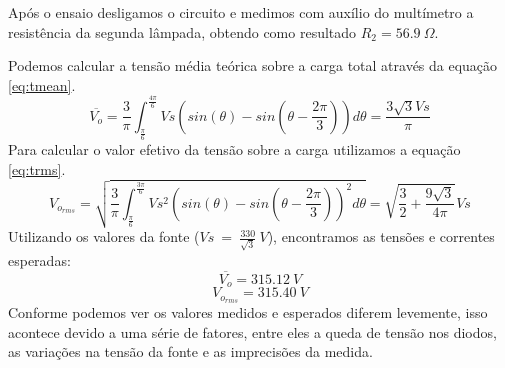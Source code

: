 \documentclass{report}
\begin{document}
Após o ensaio desligamos o circuito e medimos com auxílio do multímetro a resistência da segunda lâmpada, obtendo como resultado $R_2=56.9\ \Omega$.

Podemos calcular a tensão média teórica sobre a carga total através da equação \ref{eq:tmean}.
\begin{equation}
	\overline{V_o} = \frac{3}{\pi} \int_{\frac{\pi}{6}}^{\frac{4\pi}{6}}{Vs(sin(\theta) - sin(\theta - \frac{2\pi}{3}))d\theta} = \frac{3\sqrt{3}Vs}{\pi}
	\label{eq:tmean}
\end{equation}
Para calcular o valor efetivo da tensão sobre a carga utilizamos a equação \ref{eq:trms}.
\begin{equation}
	V_{o_{rms}} = \sqrt{\frac{3}{\pi} \int_{\frac{\pi}{6}}^{\frac{3\pi}{6}}{Vs^2(sin(\theta) - sin(\theta - \frac{2\pi}{3}))^2 d\theta}} = \sqrt{\frac{3}{2} + \frac{9\sqrt{3}}{4\pi}}Vs
	\label{eq:trms}
\end{equation}
Utilizando os valores da fonte ($Vs\ =\ \frac{330}{\sqrt{3}}\ V$), encontramos as tensões e correntes esperadas:
\begin{equation}
	\overline{V_o} = 315.12\ V
\end{equation}
\begin{equation}
	V_{o_{rms}} =  315.40\ V
\end{equation}
Conforme podemos ver os valores medidos e esperados diferem levemente, isso acontece devido a uma série de fatores, entre eles a queda de tensão nos diodos, as variações na tensão da fonte e as imprecisões da medida.

\end{document}
